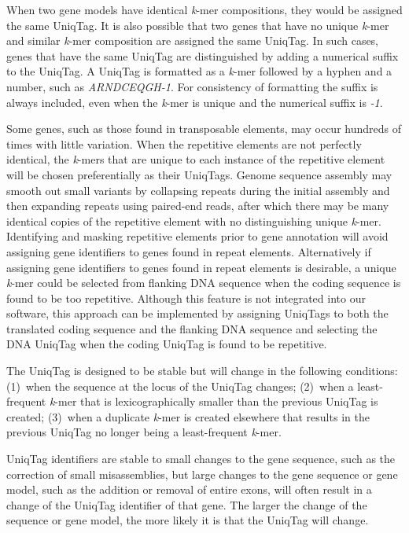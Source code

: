 \documentclass[10pt]{article}
\begin{document}
When two gene models have identical \emph{k}-mer compositions, they
would be assigned the same UniqTag. It is also possible that two genes
that have no unique \emph{k}-mer and similar \emph{k}-mer composition
are assigned the same UniqTag. In such cases, genes that have the same
UniqTag are distinguished by adding a numerical suffix to the UniqTag. A
UniqTag is formatted as a \emph{k}-mer followed by a hyphen and a
number, such as \emph{ARNDCEQGH-1}. For consistency of formatting the
suffix is always included, even when the \emph{k}-mer is unique and the
numerical suffix is \emph{-1}.

Some genes, such as those found in transposable elements, may occur
hundreds of times with little variation. When the repetitive elements
are not perfectly identical, the \emph{k}-mers that are unique to each
instance of the repetitive element will be chosen preferentially as
their UniqTags. Genome sequence assembly may smooth out small variants
by collapsing repeats during the initial assembly and then expanding
repeats using paired-end reads, after which there may be many identical
copies of the repetitive element with no distinguishing unique
\emph{k}-mer. Identifying and masking repetitive elements prior to gene
annotation will avoid assigning gene identifiers to genes found in
repeat elements. Alternatively if assigning gene identifiers to genes
found in repeat elements is desirable, a unique \emph{k}-mer could be
selected from flanking DNA sequence when the coding sequence is found to
be too repetitive. Although this feature is not integrated into our
software, this approach can be implemented by assigning UniqTags to both
the translated coding sequence and the flanking DNA sequence and
selecting the DNA UniqTag when the coding UniqTag is found to be
repetitive.

The UniqTag is designed to be stable but will change in the following
conditions: (1)~when the sequence at the locus of the UniqTag changes;
(2)~when a least-frequent \emph{k}-mer that is lexicographically smaller
than the previous UniqTag is created; (3)~when a duplicate \emph{k}-mer
is created elsewhere that results in the previous UniqTag no longer
being a least-frequent \emph{k}-mer.

UniqTag identifiers are stable to small changes to the gene sequence,
such as the correction of small misassemblies, but large changes to the
gene sequence or gene model, such as the addition or removal of entire
exons, will often result in a change of the UniqTag identifier of that
gene. The larger the change of the sequence or gene model, the more
likely it is that the UniqTag will change.
\end{document}
